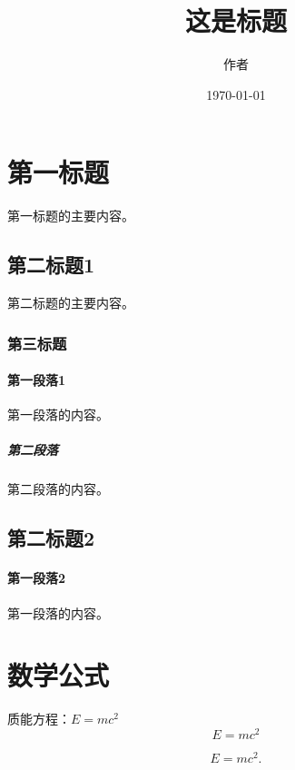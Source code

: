 \documentclass[UTF8]{ctexart}
\title{这是标题}
\author{作者}
\date{\today}
\begin{document}
\maketitle
\tableofcontents
\section{第一标题}
第一标题的主要内容。
\subsection{第二标题1}
第二标题的主要内容。
\subsubsection{第三标题}
\paragraph{第一段落1}
第一段落的内容。
\subparagraph{第二段落}
第二段落的内容。
\subsection{第二标题2}
\paragraph{第一段落2} 第一段落的内容。
\section{数学公式}
质能方程：$E=mc^2$
\[E=mc^2\]

\begin{equation}
E=mc^2.
\end{equation}
\end{document}
